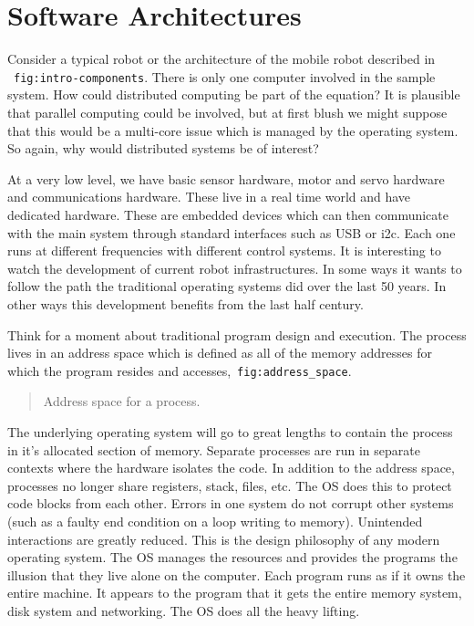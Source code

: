 \hypertarget{software-architectures}{%
\section{Software Architectures}\label{software-architectures}}

Consider a typical robot or the architecture of the mobile robot
described in ~\texttt{fig:intro-components}. There is only one computer
involved in the sample system. How could distributed computing be part
of the equation? It is plausible that parallel computing could be
involved, but at first blush we might suppose that this would be a
multi-core issue which is managed by the operating system. So again, why
would distributed systems be of interest?

At a very low level, we have basic sensor hardware, motor and servo
hardware and communications hardware. These live in a real time world
and have dedicated hardware. These are embedded devices which can then
communicate with the main system through standard interfaces such as USB
or i2c. Each one runs at different frequencies with different control
systems. It is interesting to watch the development of current robot
infrastructures. In some ways it wants to follow the path the
traditional operating systems did over the last 50 years. In other ways
this development benefits from the last half century.

Think for a moment about traditional program design and execution. The
process lives in an address space which is defined as all of the memory
addresses for which the program resides and
accesses,~\texttt{fig:address\_space}.

\begin{quote}
Address space for a process.
\end{quote}

The underlying operating system will go to great lengths to contain the
process in it's allocated section of memory. Separate processes are run
in separate contexts where the hardware isolates the code. In addition
to the address space, processes no longer share registers, stack, files,
etc. The OS does this to protect code blocks from each other. Errors in
one system do not corrupt other systems (such as a faulty end condition
on a loop writing to memory). Unintended interactions are greatly
reduced. This is the design philosophy of any modern operating system.
The OS manages the resources and provides the programs the illusion that
they live alone on the computer. Each program runs as if it owns the
entire machine. It appears to the program that it gets the entire memory
system, disk system and networking. The OS does all the heavy lifting.

